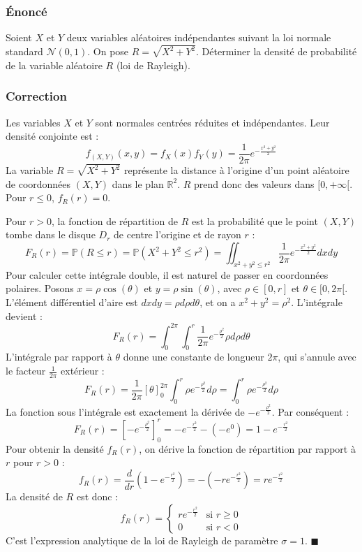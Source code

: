 \documentclass[11pt,a4paper]{article}
\begin{document}
\subsubsection*{Énoncé}

Soient $X$ et $Y$ deux variables aléatoires indépendantes suivant la loi normale standard $\mathcal{N}(0, 1)$.
On pose $R = \sqrt{X^2 + Y^2}$.
Déterminer la densité de probabilité de la variable aléatoire $R$ (loi de Rayleigh).

\subsubsection*{Correction}

Les variables $X$ et $Y$ sont normales centrées réduites et indépendantes. Leur densité conjointe est :
$$ f_{(X,Y)}(x, y) = f_X(x) f_Y(y) = \frac{1}{2\pi} e^{-\frac{x^2 + y^2}{2}} $$
La variable $R = \sqrt{X^2 + Y^2}$ représente la distance à l'origine d'un point aléatoire de coordonnées $(X,Y)$ dans le plan $\mathbb{R}^2$. $R$ prend donc des valeurs dans $[0, +\infty[$. Pour $r \leq 0$, $f_R(r) = 0$.

Pour $r > 0$, la fonction de répartition de $R$ est la probabilité que le point $(X,Y)$ tombe dans le disque $D_r$ de centre l'origine et de rayon $r$ :
$$ F_R(r) = \mathbb{P}(R \leq r) = \mathbb{P}(X^2 + Y^2 \leq r^2) = \iint_{x^2 + y^2 \leq r^2} \frac{1}{2\pi} e^{-\frac{x^2 + y^2}{2}} dx dy $$
Pour calculer cette intégrale double, il est naturel de passer en coordonnées polaires.
Posons $x = \rho \cos(\theta)$ et $y = \rho \sin(\theta)$, avec $\rho \in [0, r]$ et $\theta \in [0, 2\pi[$. L'élément différentiel d'aire est $dx dy = \rho d\rho d\theta$, et on a $x^2 + y^2 = \rho^2$.
L'intégrale devient :
$$ F_R(r) = \int_{0}^{2\pi} \int_{0}^{r} \frac{1}{2\pi} e^{-\frac{\rho^2}{2}} \rho d\rho d\theta $$
L'intégrale par rapport à $\theta$ donne une constante de longueur $2\pi$, qui s'annule avec le facteur $\frac{1}{2\pi}$ extérieur :
$$ F_R(r) = \frac{1}{2\pi} [\theta]_0^{2\pi} \int_{0}^{r} \rho e^{-\frac{\rho^2}{2}} d\rho = \int_{0}^{r} \rho e^{-\frac{\rho^2}{2}} d\rho $$
La fonction sous l'intégrale est exactement la dérivée de $-e^{-\frac{\rho^2}{2}}$. Par conséquent :
$$ F_R(r) = \left[ -e^{-\frac{\rho^2}{2}} \right]_0^r = -e^{-\frac{r^2}{2}} - (-e^0) = 1 - e^{-\frac{r^2}{2}} $$
Pour obtenir la densité $f_R(r)$, on dérive la fonction de répartition par rapport à $r$ pour $r > 0$ :
$$ f_R(r) = \frac{d}{dr} \left( 1 - e^{-\frac{r^2}{2}} \right) = - \left( -r e^{-\frac{r^2}{2}} \right) = r e^{-\frac{r^2}{2}} $$
La densité de $R$ est donc :
$$ f_R(r) = \begin{cases} r e^{-\frac{r^2}{2}} & \text{si } r \geq 0 \\ 0 & \text{si } r < 0 \end{cases} $$
C'est l'expression analytique de la loi de Rayleigh de paramètre $\sigma = 1$. $\blacksquare$
\end{document}
